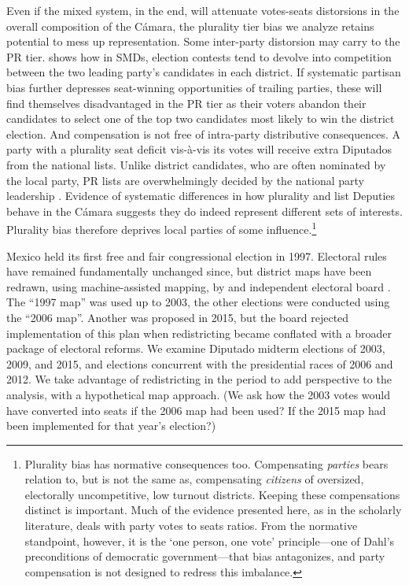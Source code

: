 \documentclass[letter,12pt]{article}
\begin{document}
Even if the mixed system, in the end, will attenuate votes-seats distorsions in the overall composition of the C\'amara, the plurality tier bias we analyze retains potential to mess up representation. Some inter-party distorsion may carry to the PR tier. \citet{cox.1997} shows how in SMDs, election contests tend to devolve into competition between the two leading party's candidates in each district. If systematic partisan bias further depresses seat-winning opportunities of trailing parties, these will find themselves disadvantaged in the PR tier as their voters abandon their candidates to select one of the top two candidates most likely to win the district election. And compensation is not free of intra-party distributive consequences. A party with a plurality seat deficit vis-\`a-vis its votes will receive extra Diputados from the national lists. Unlike district candidates, who are often nominated by the local party, PR lists are overwhelmingly decided by the national party leadership \citep{poire.phd.2002}. Evidence of systematic differences in how plurality and list Deputies behave in the C\'amara \citep{kerevelPork2015} suggests they do indeed represent different sets of interests. Plurality bias therefore deprives local parties of some influence.\footnote{Plurality bias has normative consequences too. Compensating \emph{parties} bears relation to, but is not the same as, compensating \emph{citizens} of oversized, electorally uncompetitive, low turnout districts. Keeping these compensations distinct is important. Much of the evidence presented here, as in the scholarly literature, deals with party votes to seats ratios. From the normative standpoint, however, it is the `one person, one vote' principle---one of Dahl's \citeyearpar{dahl.1972} preconditions of democratic government---that bias antagonizes, and party compensation is not designed to redress this imbalance.} 

Mexico held its first free and fair congressional election in 1997. Electoral rules have remained fundamentally unchanged since, but district maps have been redrawn, using machine-assisted mapping, by and independent electoral board \citep{lujambio.vives.2008,trelles.mtz.polygob2012}. The ``1997 map'' was used up to 2003, the other elections were conducted using the ``2006 map''. Another was proposed in 2015, but the board rejected implementation of this plan when redistricting became conflated with a broader package of electoral reforms. We examine Diputado midterm elections of 2003, 2009, and 2015, and elections concurrent with the presidential races of 2006 and 2012. We take advantage of redistricting in the period to add perspective to the analysis, with a hypothetical map approach. (We ask how the 2003 votes would have converted into seats if the 2006 map had been used? If the 2015 map had been implemented for that year's election?) 
\end{document}
